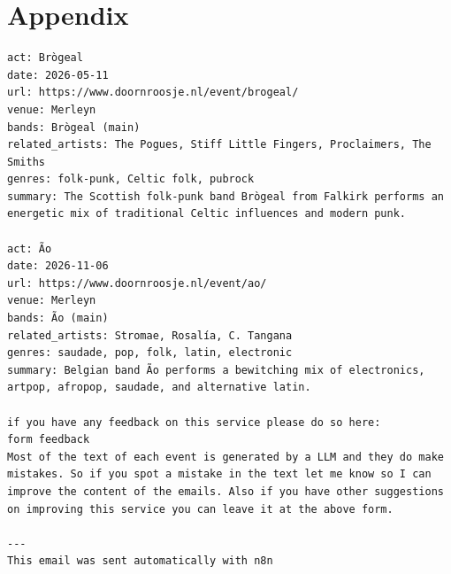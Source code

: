 \documentclass{article}
\begin{document}
\section*{Appendix}
\begin{verbatim}
act: Brògeal
date: 2026-05-11
url: https://www.doornroosje.nl/event/brogeal/
venue: Merleyn
bands: Brògeal (main)
related_artists: The Pogues, Stiff Little Fingers, Proclaimers, The Smiths
genres: folk-punk, Celtic folk, pubrock
summary: The Scottish folk-punk band Brògeal from Falkirk performs an energetic mix of traditional Celtic influences and modern punk.

act: Ão
date: 2026-11-06
url: https://www.doornroosje.nl/event/ao/
venue: Merleyn
bands: Ão (main)
related_artists: Stromae, Rosalía, C. Tangana
genres: saudade, pop, folk, latin, electronic
summary: Belgian band Ão performs a bewitching mix of electronics, artpop, afropop, saudade, and alternative latin.

if you have any feedback on this service please do so here:
form feedback
Most of the text of each event is generated by a LLM and they do make mistakes. So if you spot a mistake in the text let me know so I can improve the content of the emails. Also if you have other suggestions on improving this service you can leave it at the above form.

---
This email was sent automatically with n8n
\end{verbatim}

 
\end{document}
